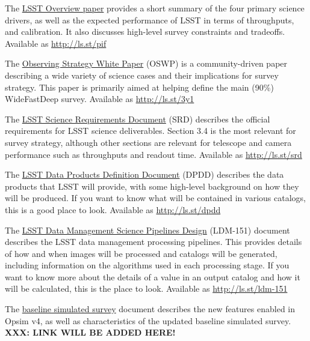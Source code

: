 \documentclass[DM,lsstdraft,toc,usenatbib]{lsstdoc}
\begin{document}
The \href{https://www.lsst.org/content/lsst-science-drivers-reference-design-and-anticipated-data-products}{LSST Overview paper} provides a short summary of the four primary science drivers, as well as the expected performance of LSST in terms of throughputs, and calibration. 
It also discusses high-level survey constraints and tradeoffs.  Available as \url{http://ls.st/pif}

The \href{https://github.com/LSSTScienceCollaborations/ObservingStrategy}{Observing Strategy White Paper}  (OSWP) is a community-driven paper describing a wide variety of science cases and their implications for survey strategy. This paper is primarily aimed at helping define the main (90\%) WideFastDeep survey. Available as \url{http://ls.st/3y1}

The \href{http:/ls.st/srd}{LSST Science Requirements Document} (SRD) describes the official requirements for LSST science deliverables. Section 3.4 is the most relevant for survey strategy, although other sections are relevant for telescope and camera performance such as throughputs and readout time. Available as \url{http://ls.st/srd}

The \href{http://ls.st/dpdd}{LSST Data Products Definition Document} (DPDD) describes the data products that LSST will provide, with some high-level background on how they will be produced. If you want to know what will be contained in various catalogs, this is a good place to look. Available as \url{http://ls.st/dpdd}

The \href{http://ls.st/ldm-151}{LSST Data Management Science Pipelines Design} (LDM-151) document describes the LSST data management processing pipelines. This provides details of how and when images will be processed and catalogs will be generated, including information on the algorithms used in each processing stage. If you want to know more about the details of a value in an output catalog and how it will be calculated, this is the place to look. Available as \url{http://ls.st/ldm-151}


The \href{https://github.com/lsst-pst/survey_strategy/blob/master/db/baseline-doc/baseline.pdf}{baseline simulated survey} document describes the new features enabled in Opsim v4, as well as characteristics of the updated baseline simulated survey. 
{\bf XXX: LINK WILL BE ADDED HERE!}
\end{document}
